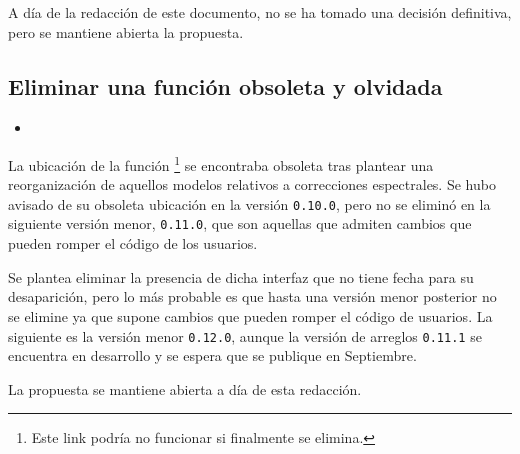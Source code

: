 A día de la redacción de este documento, no se ha tomado una decisión definitiva, pero se mantiene abierta la propuesta.

\subsection{Eliminar una función obsoleta y olvidada}

\begin{itemize}
    \item {}
\end{itemize}

La ubicación de la función \footnote{Este link podría no funcionar si finalmente se elimina.} se encontraba obsoleta tras plantear una reorganización de aquellos modelos relativos a correcciones espectrales. Se hubo avisado de su obsoleta ubicación en la versión \texttt{0.10.0}, pero no se eliminó en la siguiente versión menor, \texttt{0.11.0}, que son aquellas que admiten cambios que pueden romper el código de los usuarios.

Se plantea eliminar la presencia de dicha interfaz que no tiene fecha para su desaparición, pero lo más probable es que hasta una versión menor posterior no se elimine ya que supone cambios que pueden romper el código de usuarios. La siguiente es la versión menor \texttt{0.12.0}, aunque la versión de arreglos \texttt{0.11.1} se encuentra en desarrollo y se espera que se publique en Septiembre.

La propuesta se mantiene abierta a día de esta redacción.
